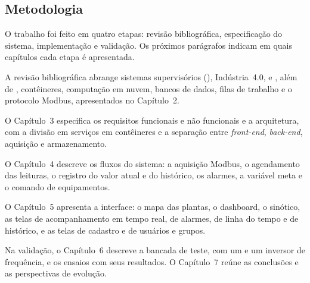\subsection{Metodologia}

\par O trabalho foi feito em quatro etapas: revisão bibliográfica, especificação do sistema, implementação e validação. Os próximos parágrafos indicam em quais capítulos cada etapa é apresentada.

\par A revisão bibliográfica abrange sistemas supervisórios (), Indústria~4.0,  e , além de , contêineres, computação em nuvem, bancos de dados, filas de trabalho e o protocolo Modbus, apresentados no Capítulo~2.

\par O Capítulo~3 especifica os requisitos funcionais e não funcionais e a arquitetura, com a divisão em serviços em contêineres e a separação entre \emph{front-end}, \emph{back-end}, aquisição e armazenamento.

\par O Capítulo~4 descreve os fluxos do sistema: a aquisição Modbus, o agendamento das leituras, o registro do valor atual e do histórico, os alarmes, a variável meta e o comando de equipamentos.

\par O Capítulo~5 apresenta a interface: o mapa das plantas, o dashboard, o sinótico, as telas de acompanhamento em tempo real, de alarmes, de linha do tempo e de histórico, e as telas de cadastro e de usuários e grupos.

\par Na validação, o Capítulo~6 descreve a bancada de teste, com um  e um inversor de frequência, e os ensaios com seus resultados. O Capítulo~7 reúne as conclusões e as perspectivas de evolução.
